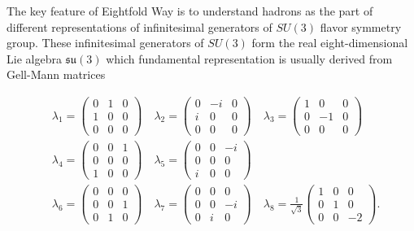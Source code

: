 \documentclass[a4paper,11pt]{report}
\begin{document}
The key feature of Eightfold Way is to understand hadrons as the part of
different representations of infinitesimal generators of $SU(3)$ flavor symmetry
group. These infinitesimal generators of $SU(3)$ form the real eight-dimensional
Lie algebra $\mathfrak{su}(3)$ which fundamental representation is usually
derived from Gell-Mann matrices

\begin{align}
  &\lambda_1 = \begin{pmatrix} 0 & 1 & 0 \\ 1 & 0 & 0 \\ 0 & 0 & 0 \end{pmatrix}
  \quad
  \lambda_2 = \begin{pmatrix} 0 & -i & 0 \\ i & 0 & 0 \\ 0 & 0 & 0 \end{pmatrix}
  \quad
  \lambda_3 = \begin{pmatrix} 1 & 0 & 0 \\ 0 & -1& 0 \\ 0 & 0 & 0 \end{pmatrix}
  \nonumber \\
  &\lambda_4 = \begin{pmatrix} 0 & 0 & 1 \\ 0 & 0 & 0 \\ 1 & 0 & 0 \end{pmatrix}
  \quad
  \lambda_5 = \begin{pmatrix} 0 & 0 & -i\\ 0 & 0 & 0 \\ i & 0 & 0 \end{pmatrix}
  \label{eq:GellMannMatrices} \\
  &\lambda_6 = \begin{pmatrix} 0 & 0 & 0 \\ 0 & 0 & 1 \\ 0 & 1 & 0 \end{pmatrix}
  \quad
  \lambda_7 = \begin{pmatrix} 0 & 0 & 0 \\ 0 & 0 & -i\\ 0 & i & 0 \end{pmatrix}
  \quad
  \lambda_8 = \frac{1}{\sqrt{3}} \begin{pmatrix} 1 & 0 & 0 \\ 0 & 1 & 0 \\ 
                                                              0 & 0 & -2 \end{pmatrix}.
  \nonumber
\end{align}
\end{document}
